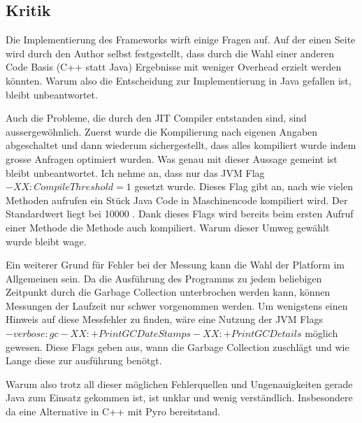 \subsection{Kritik} 


Die Implementierung des Frameworks wirft einige Fragen auf. Auf der einen Seite wird durch den Author selbst festgestellt, dass durch die Wahl einer anderen Code Basis (C++ statt Java) Ergebnisse mit weniger Overhead erzielt werden könnten. Warum also die Entscheidung zur Implementierung in Java gefallen ist, bleibt unbeantwortet.

Auch die Probleme, die durch den JIT Compiler entstanden sind, sind aussergewöhnlich. Zuerst wurde die Kompilierung nach eigenen Angaben abgeschaltet und dann wiederum sichergestellt, dass alles kompiliert wurde indem grosse Anfragen optimiert wurden. Was genau mit dieser Aussage gemeint ist bleibt unbeantwortet.  Ich nehme an, dass nur das JVM Flag $-XX:CompileThreshold=1$ gesetzt wurde. Dieses Flag gibt an, nach wie vielen Methoden aufrufen ein Stück Java Code in Maschinencode kompiliert wird. Der Standardwert liegt bei 10000 \cite{oracle2015VMOptions}. Dank dieses Flags wird bereits beim ersten Aufruf einer Methode die Methode auch kompiliert. Warum dieser Umweg gewählt wurde bleibt wage.

Ein weiterer Grund für Fehler bei der Messung kann die Wahl der Platform im Allgemeinen sein. Da die Ausführung des Programms zu jedem beliebigen Zeitpunkt durch die Garbage Collection unterbrochen werden kann, können Messungen der Laufzeit nur schwer vorgenommen werden. Um wenigstens einen Hinweis auf diese Messfehler zu finden, wäre eine Nutzung der JVM Flags $ -verbose:gc -XX:+PrintGCDateStamps -XX:+PrintGCDetails$ möglich gewesen. Diese Flags geben aus, wann die Garbage Collection zuschlägt und wie Lange diese zur ausführung benötgt. \cite{andreasson2015JVM}  


Warum also trotz all dieser möglichen Fehlerquellen und Ungenauigkeiten gerade Java zum Einsatz gekommen ist, ist unklar und wenig verständlich. Insbesondere da eine Alternative in C++ mit Pyro bereitstand.
